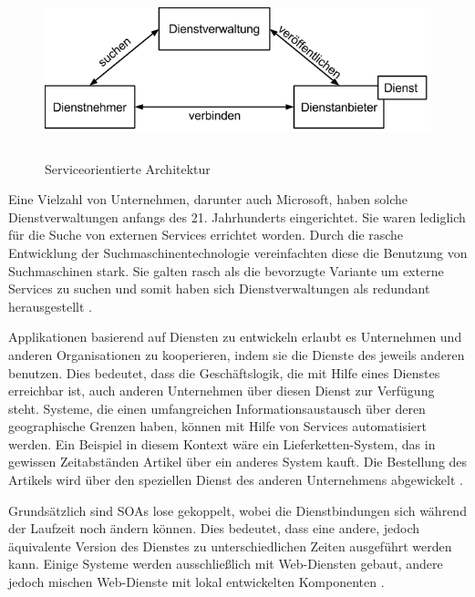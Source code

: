 \begin{figure}[h]
\centering
\includegraphics[height=5.0cm]{images/soa.png}
\caption[
Serviceorientierte Architektur, Urldate: 04.2014 \newline
\small\texttt{\url{http://www.w3.org/2003/Talks/0521-hh-wsa/slide5-0.html}}
]{Serviceorientierte Architektur}
\label{fig:2_SOA}
\end{figure}

Eine Vielzahl von Unternehmen, darunter auch Microsoft, haben solche Dienstverwaltungen anfangs des 21. Jahrhunderts eingerichtet. Sie waren lediglich für die Suche von externen Services errichtet worden. Durch die rasche Entwicklung der Suchmaschinentechnologie vereinfachten diese die Benutzung von Suchmaschinen stark. Sie galten rasch als die bevorzugte Variante um externe Services zu suchen und somit haben sich Dienstverwaltungen als redundant herausgestellt \citereset \autocite[siehe][S. 511]{Sommerville.2011}.

Applikationen basierend auf Diensten zu entwickeln erlaubt es Unternehmen und anderen Organisationen zu kooperieren, indem sie die Dienste des jeweils anderen benutzen. Dies bedeutet, dass die Geschäftslogik, die mit Hilfe eines Dienstes erreichbar ist, auch anderen Unternehmen über diesen Dienst zur Verfügung steht. Systeme, die einen umfangreichen Informationsaustausch über deren geographische Grenzen haben, können mit Hilfe von Services automatisiert werden. Ein Beispiel in diesem Kontext wäre ein Lieferketten-System, das in gewissen Zeitabständen Artikel über ein anderes System kauft.
Die Bestellung des Artikels wird über den speziellen Dienst des anderen Unternehmens abgewickelt \citereset \autocite[siehe][S. 512]{Sommerville.2011}.

Grundsätzlich sind SOAs lose gekoppelt, wobei die Dienstbindungen sich während der Laufzeit noch ändern können. Dies bedeutet, dass eine andere, jedoch äquivalente Version des Dienstes zu unterschiedlichen Zeiten ausgeführt werden kann. Einige Systeme werden ausschließlich mit Web-Diensten gebaut, andere jedoch mischen Web-Dienste mit lokal entwickelten Komponenten \citereset \autocite[siehe][S. 512]{Sommerville.2011}.

